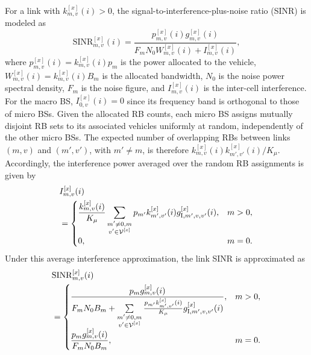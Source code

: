 \documentclass[10pt,journal,letterpaper]{IEEEtran}
\newcommand{\rev}[1]{\textcolor{revisioncolor}{{}#1}}
\newcommand{\omitted}[1]{}
\theoremstyle{remark}
\begin{document}
\omitted{}\rev{For a link with $k_{m,v}^{[x]}(i)>0$, the signal-to-interference-plus-noise ratio (SINR) is modeled as}
\begin{equation}
    \mathrm{SINR}_{m,v}^{[x]}(i) = \frac{p_{m,v}^{[x]}(i) g_{m,v}^{[x]}(i)}{F_{ m}N_0 W_{m,v}^{[x]}(i) + I_{m,v}^{[x]}(i) },
    \label{eq:SINR}
\end{equation}
where $p_{m,v}^{[x]}(i) = k_{m,v}^{[x]}(i) p_m$ is the power allocated to the vehicle, $W_{m,v}^{[x]}(i) = k_{m,v}^{[x]}(i) B_m$ is the allocated bandwidth, $N_0$ is the noise power spectral density, $F_{m}$ is the noise figure, and $I_{m,v}^{[x]}(i)$ is the inter-cell interference. For the macro BS, $I_{0,v}^{[x]}(i)=0$ since its frequency band is orthogonal to those of micro BSs. 
\omitted{}\rev{Given the allocated RB counts, each micro BS assigns mutually disjoint RB sets to its associated vehicles uniformly at random, independently of the other micro BSs. The expected number of overlapping RBs between links $(m,v)$ and $(m',v')$, with $m'\ne m$, is therefore $k_{m,v}^{[x]}(i)k_{m',v'}^{[x]}(i)/K_\mu$.}
Accordingly, \omitted{}\rev{the interference power averaged over the random RB assignments is given by}
\begin{equation}
    \begin{aligned}
        & I_{m,v}^{[x]}(i) \\
        & =
        \begin{cases}
            \displaystyle
            \omitted{}\rev{\frac{k_{m,v}^{[x]}(i)}{K_\mu}
            \sum\limits_{\substack{m'\neq 0,m\\v'\in\mathcal V^{[x]}}}
            p_{m'}k_{m',v'}^{[x]}(i)g_{{\rm I},m',v,v'}^{[x]}(i)}, & m>0, \\
            \displaystyle
            0, & m=0.
        \end{cases}
    \end{aligned}
    \label{eq:interference}
\end{equation}
\omitted{}\rev{Under this average interference approximation, the link SINR is approximated as}
\begin{equation}
    \begin{aligned}
        & \mathrm{SINR}_{m,v}^{[x]}(i) \\
        & = 
        \begin{cases}
            \displaystyle
            \frac{ p_m g_{m,v}^{[x]}(i)}
            {F_m N_0 B_m 
             + \sum\limits_{\substack{m'\neq 0,m\\\rev{v'\in\mathcal V^{[x]}}}}
               \omitted{}\rev{\frac{p_{m'}k_{m',v'}^{[x]}(i)}{K_\mu}
               g_{{\rm I},m',v,v'}^{[x]}(i)}}, 
            & m>0, \\[2ex]
            \displaystyle
            \frac{ p_m g_{m,v}^{[x]}(i)}{F_m N_0 B_m}, 
            & m=0.
        \end{cases}
    \end{aligned}
    \label{eq:SINR simplified}
\end{equation}
\end{document}
